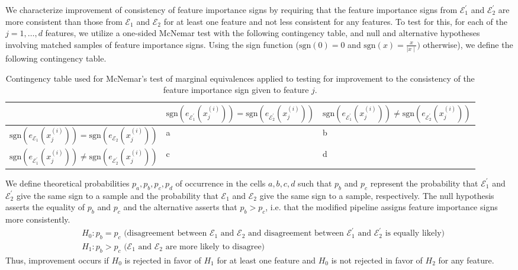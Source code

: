 \documentclass[mnsc,blindrev]{informs3}
\newcommand{\mE}{\mathcal{E}}
\begin{document}
        We characterize improvement of consistency of feature importance signs by requiring that the feature importance signs from $\mE^\prime_1$ and $\mE^\prime_2$ are more consistent than those from $\mE_1$ and $\mE_2$ for at least one feature and not less consistent for any features. To test for this, for each of the $j=1,\ldots,d$ features, we utilize a one-sided McNemar test with the following contingency table, and null and alternative hypotheses involving matched samples of feature importance signs. Using the sign function ($\text{sgn}(0)=0$ and $\text{sgn}(x)=\frac{x}{\mid x\mid})$ otherwise), we define the following contingency table.
\begin{table}[h]
\centering
\begin{tabular}{|l|l|l|}
\hline
& $\text{sgn}(e_{\mE^\prime_1}(x_j^{(i)}))=\text{sgn}(e_{\mE^\prime_2}(x_j^{(i)}))$ & $\text{sgn}(e_{\mE^\prime_1}(x_j^{(i)}))\neq\text{sgn}(e_{\mE^\prime_2}(x_j^{(i)}))$ \\ \hline
$\text{sgn}(e_{\mE_1}(x_j^{(i)}))=\text{sgn}(e_{\mE_2}(x_j^{(i)}))$                  & a                                                                             & b                                                                                \\ \hline
$\text{sgn}(e_{\mE^\prime_1}(x_j^{(i)}))\neq\text{sgn}(e_{\mE^\prime_2}(x_j^{(i)}))$ & c                                                                             & d                                                                                \\ \hline
\end{tabular}
\caption{Contingency table used for McNemar's test of marginal equivalences applied to testing for improvement to the consistency of the feature importance sign given to feature $j$.}
\label{tab:my-table}
\end{table}
We define theoretical probabilities $p_a,p_b,p_c,p_d$ of occurrence in the cells $a,b,c,d$ such that $p_b$ and $p_c$ represent the probability that $\mE^\prime_1$ and $\mE^\prime_2$ give the same sign to a sample and the probability that $\mE_1$ and $\mE_2$ give the same sign to a sample, respectively. The null hypothesis asserts the equality of $p_b$ and $p_c$ and the alternative asserts that $p_b>p_c$, i.e. that the modified pipeline assigns feature importance signs more consistently.
        \begin{align*}
            & H_0: p_b = p_c \text{ (disagreement between $\mE_1$ and $\mE_2$ and disagreement between $\mE^\prime_1$ and $\mE^\prime_2$ is equally likely)}\\
            & H_1: p_b > p_c \text{ ($\mE_1$ and $\mE_2$ are more likely to disagree)} 
        \end{align*}
        Thus, improvement occurs if $H_0$ is rejected in favor of $H_1$ for at least one feature and $H_0$ is not rejected in favor of $H_2$ for any feature.
\end{document}
